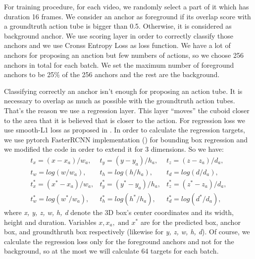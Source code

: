 \documentclass{report}
\begin{document}
For training procedure, for each video, we randomly select a part of it which has duration 16 frames. We consider an anchor as foreground if its overlap score with a groundtruth
action tube is bigger than 0.5. Otherwise, it is considered as background anchor. We use scoring layer in order to correctly classify those anchors and we use
Cronss Entropy Loss as loss function. We have a lot of anchors for proposing an anction but few numbers of actions, so we choose 256 anchors in total for each batch. We set the maximum
number of foreground anchors to be  25\% of the 256 anchors and the rest are the background.\par
Classifying correctly an anchor isn't enough for proposing an action tube. It is necessary to overlap as much as possible with the groundtruth action tubes. That's the reason we use a
regression layer. This layer ``moves'' the cuboid closer to the area that it is believed that is closer to the action.
For regression loss we use smooth-L1 loss as proposed in \cite{DBLP:journals/corr/GirshickDDM13}. In order to calculate
the regression targets, we use pytorch FasterRCNN implementation (\cite{jjfaster2rcnn}) for bounding box regression and 
we modified the code in order to extend it for 3 dimensions. %
So we have:
\[ \begin{matrix}
    t_x = (x-x_a)/w_a, & t_y = (y-y_a)/h_a, & t_z= (z-z_a)/d_a, \\
    t_w= log(w/w_a), & t_h= log(h/h_a), & t_d = log(d/d_a), \\
    t^*_x = (x^* - x_a)/w_a, & t^*_y = (y^* - y_a)/h_a, & t^*_z = (z^* - z_a)/d_a, \\
    t^*_w = log(w^* /w_a), & t^*_h = log(h^*/h_a), & t^*_d = log(d^*/d_a),
  \end{matrix}
\]
where \textit{x, y, z, w, h, d} denote the 3D box's center coordinates and its width, height and duration. Variables $x, x_a, \text{ and } x^*$
are for the predicted box, anchor box, and groundthruth box respectively (likewise for \textit{y, z, w, h, d}). Of course, we calculate the
regression loss only for the foreground anchors and not for the background, so at the most we will calculate 64 targets
for each batch. \par
\end{document}
